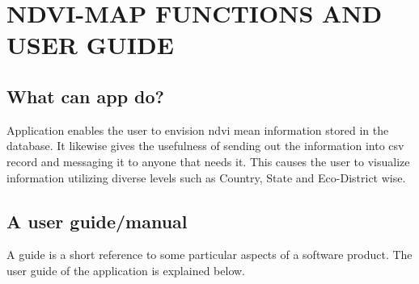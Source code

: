 \chapter{NDVI-MAP FUNCTIONS AND USER GUIDE}
\label{chap:ndvi & it's user guide}

\section{What can app do?}

Application enables the user to envision \gls{ndvi} mean information stored in the database. It likewise gives the usefulness of sending out the information into \gls{csv} record and messaging it to anyone that needs it. This causes the user to visualize information utilizing diverse levels such as Country, State and Eco-District wise.

\section{A user guide/manual}

A guide is a short reference to some particular aspects of a software product. The user guide of the application is explained below.

